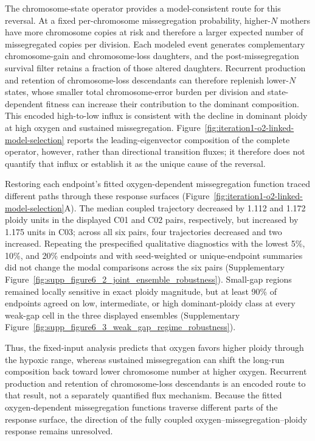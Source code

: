 \documentclass[11pt]{article}
\begin{document}
The chromosome-state operator provides a model-consistent route for this reversal. At a fixed per-chromosome missegregation probability, higher-\(N\) mothers have more chromosome copies at risk and therefore a larger expected number of missegregated copies per division. Each modeled event generates complementary chromosome-gain and chromosome-loss daughters, and the post-missegregation survival filter retains a fraction of those altered daughters. Recurrent production and retention of chromosome-loss descendants can therefore replenish lower-\(N\) states, whose smaller total chromosome-error burden per division and state-dependent fitness can increase their contribution to the dominant composition. This encoded high-to-low influx is consistent with the decline in dominant ploidy at high oxygen and sustained missegregation. Figure~\ref{fig:iteration1-o2-linked-model-selection} reports the leading-eigenvector composition of the complete operator, however, rather than directional transition fluxes; it therefore does not quantify that influx or establish it as the unique cause of the reversal.

Restoring each endpoint's fitted oxygen-dependent missegregation function traced different paths through these response surfaces (Figure~\ref{fig:iteration1-o2-linked-model-selection}A). The median coupled trajectory decreased by 1.112 and 1.172 ploidy units in the displayed C01 and C02 pairs, respectively, but increased by 1.175 units in C03; across all six pairs, four trajectories decreased and two increased. Repeating the prespecified qualitative diagnostics with the lowest 5\%, 10\%, and 20\% endpoints and with seed-weighted or unique-endpoint summaries did not change the modal comparisons across the six pairs (Supplementary Figure~\ref{fig:supp_figure6_2_joint_ensemble_robustness}). Small-gap regions remained locally sensitive in exact ploidy magnitude, but at least 90\% of endpoints agreed on low, intermediate, or high dominant-ploidy class at every weak-gap cell in the three displayed ensembles (Supplementary Figure~\ref{fig:supp_figure6_3_weak_gap_regime_robustness}).

Thus, the fixed-input analysis predicts that oxygen favors higher ploidy through the hypoxic range, whereas sustained missegregation can shift the long-run composition back toward lower chromosome number at higher oxygen. Recurrent production and retention of chromosome-loss descendants is an encoded route to that result, not a separately quantified flux mechanism. Because the fitted oxygen-dependent missegregation functions traverse different parts of the response surface, the direction of the fully coupled oxygen--missegregation--ploidy response remains unresolved.
\end{document}
